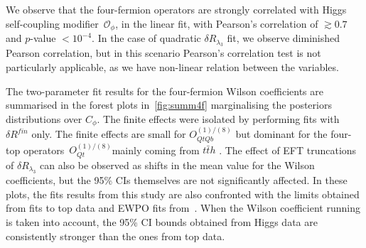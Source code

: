 	We observe that the four-fermion operators are strongly correlated with Higgs self-coupling modifier~$\mathcal O_\phi$, in the linear fit, with Pearson's correlation of $ \gtrsim 0.7$ and $p$-value $< 10^{-4}$.  In the case of quadratic $\delta R_{\lambda_3}$ fit, we observe diminished Pearson correlation, but in this scenario Pearson's correlation test is not particularly applicable, as we have non-linear relation between the variables.
	\par The two-parameter fit results for the four-fermion Wilson coefficients are summarised in the forest plots in~\autoref{fig:summ4f} marginalising the posteriors distributions over $C_\phi$. The finite effects were isolated by performing fits with $\delta R^{fin}$ only. The finite effects are small for  $O_{QtQb}^{(1)/(8)}$ but dominant for the four-top operators~$O_{Qt}^{(1)/(8)}$mainly coming from $t\bar t h$ .    The effect of EFT truncations of $\delta R_{\lambda_3}$ can also be observed as shifts in the mean value for the Wilson coefficients, but the 95\% CIs themselves are not significantly affected.  In these plots, the fits results from this study are also confronted with the limits obtained from fits to top data \cite{Ethier:2021bye, Ellis:2020unq, Hartland:2019bjb,Brivio:2019ius,DHondt:2018cww, Zhang:2017mls} and EWPO fits from~\cite{Dawson:2022bxd}. When the Wilson coefficient running is taken into account, the 95\% CI  bounds obtained from Higgs data are consistently stronger than the ones from top data.
